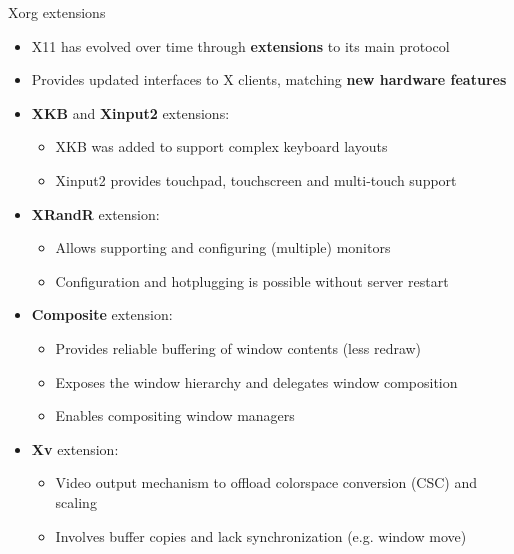 \begin{frame}{Xorg extensions}
  \begin{itemize}
  \item X11 has evolved over time through \textbf{extensions} to its main protocol
  \item Provides updated interfaces to X clients, matching \textbf{new hardware features}
  \item \textbf{XKB} and \textbf{Xinput2} extensions:
    \begin{itemize}
    \item XKB was added to support complex keyboard layouts
    \item Xinput2 provides touchpad, touchscreen and multi-touch support
    \end{itemize}
  \item \textbf{XRandR} extension:
    \begin{itemize}
    \item Allows supporting and configuring (multiple) monitors
    \item Configuration and hotplugging is possible without server restart
    \end{itemize}
  \item \textbf{Composite} extension:
    \begin{itemize}
    \item Provides reliable buffering of window contents (less redraw)
    \item Exposes the window hierarchy and delegates window composition
    \item Enables compositing window managers
    \end{itemize}
  \item \textbf{Xv} extension:
    \begin{itemize}
    \item Video output mechanism to offload colorspace conversion (CSC) and scaling
    \item Involves buffer copies and lack synchronization (e.g. window move)
    \end{itemize}
  \end{itemize}
\end{frame}


